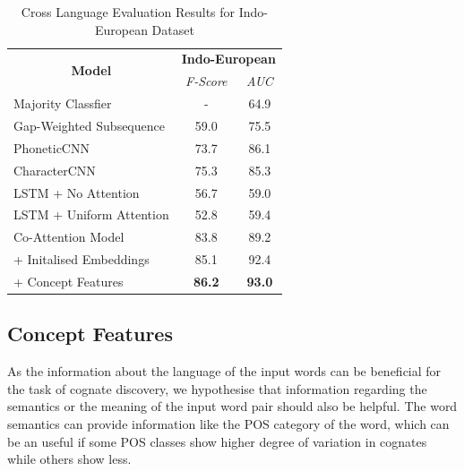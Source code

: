 \documentclass[11pt,letterpaper]{article}
\begin{document}
\begin{table}[t]
\centering

\begin{tabular}{lcc}
\multicolumn{1}{c}{\multirow{2}{*}{\textbf{Model}}} & \multicolumn{2}{c}{\textbf{Indo-European}} \\ \cline{2-3} 
\multicolumn{1}{c}{}                                & \textit{F-Score}      & \textit{AUC}       \\ \hline
Majority Classfier                                  & -                     & 64.9               \\
Gap-Weighted Subsequence                            & 59.0                  & 75.5               \\
PhoneticCNN                                         & 73.7                  & 86.1               \\
CharacterCNN                                        & 75.3                  & 85.3               \\
LSTM + No Attention                                 & 56.7                  & 59.0               \\
LSTM + Uniform Attention                            & 52.8                  & 59.4               \\ \hline
Co-Attention Model                                  & 83.8                  & 89.2               \\ \hline
+ Initalised Embeddings                             & 85.1                  & 92.4               \\
+ Concept Features                                  & \textbf{86.2}         & \textbf{93.0}     
\end{tabular}

\label{CL_res}
\caption{Cross Language Evaluation Results for Indo-European Dataset}
\end{table}

\subsection{Concept Features}

As the information about the language of the input words can be beneficial for the task of cognate discovery, we hypothesise that information regarding the semantics or the meaning of the input word pair should also be helpful. The word semantics can provide information like the POS category of the word, which can be an useful if some POS classes show higher degree of variation in cognates while others show less.
\end{document}
